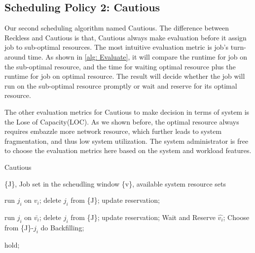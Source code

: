 \documentclass[conference]{IEEEtran}
\begin{document}
\subsection{Scheduling Policy 2: Cautious}
\label{sec:cautious}

Our second scheduling algorithm named Cautious. The difference between Reckless and Cautious is that, Cautious always make evaluation before it assign job to sub-optimal resources. The most intuitive evaluation metric is job's turn-around time. As shown in \ref{alg: Evaluate}, it will compare the runtime for job on the sub-optimal resource, and the time for waiting optimal resource plus the runtime for job on optimal resource. The result will decide whether the job will run on the sub-optimal resource promptly or wait and reserve for its optimal resource.

The other evaluation metrics for Cautious to make decision in terms of system is the Lose of Capacity(LOC). As we shown before, the optimal resource always requires embazzle more network resource, which further leads to system fragmentation, and thus low system utilization. The system administrator is free to choose the evaluation metrics here based on the system and workload features.


\begin{algorithm}
  \label{alg:scheudling2}
  \caption{Cautious}
  \begin{algorithmic}
    \State \{J\}, Job set in the scheudling window
    \State \{v\}, available system resource sets
           
            \State run $j_i$ on $v_i$;
            \State delete $j_i$ from \{J\};
            \State update reservation;
        \EndIf
        
                \State run $j_i$ on $\bar{v_i}$;
                \State delete $j_i$ from \{J\};
                \State update reservation;
            \Else
                \State Wait and Reserve $\hat{v_i}$;
                \State Choose from \{J\}-$j_i$ do Backfilling;
            \EndIf
        \EndIf
        
            \State hold;
        \EndIf
        
    \EndWhile
    
  \end{algorithmic}
\end{algorithm}
\end{document}
